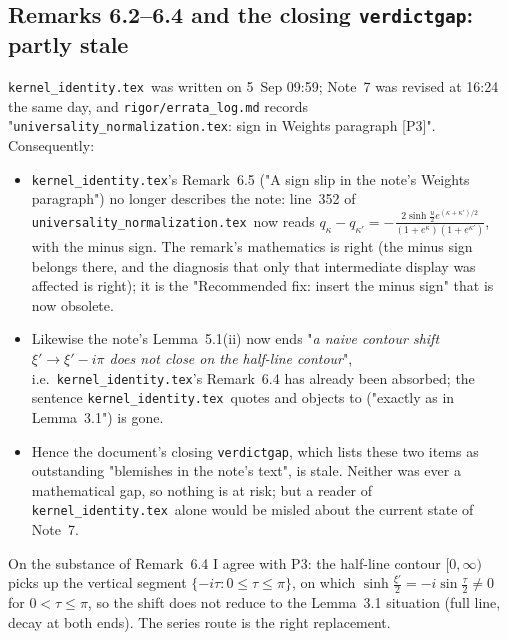 \documentclass[11pt]{article}
\newcommand{\KI}{\texttt{kernel\_identity.tex}}\newcommand{\NOTE}{\texttt{universality\_normalization.tex}}
\begin{document}
\subsection{Remarks 6.2--6.4 and the closing \texttt{verdictgap}: partly stale}
\KI\ was written on 5~Sep 09:59; Note~7 was revised at 16:24 the same day, and
\texttt{rigor/errata\_log.md} records "\NOTE: sign in Weights paragraph [P3]".  Consequently:
\begin{itemize}[leftmargin=1.4em,itemsep=1pt]
\item \KI's Remark~6.5 ("A sign slip in the note's Weights paragraph") no longer describes the
note: line~352 of \NOTE\ now reads \(q_\kappa-q_{\kappa'}=-\frac{2\sinh\frac u2e^{(\kappa+\kappa')/2}}
{(1+e^\kappa)(1+e^{\kappa'})}\), with the minus sign.  The remark's mathematics is right (the minus
sign belongs there, and the diagnosis that only that intermediate display was affected is right);
it is the "Recommended fix: insert the minus sign" that is now obsolete.
\item Likewise the note's Lemma~5.1(ii) now ends "\emph{a naive contour shift \(\xi'\to\xi'-i\pi\)
does not close on the half-line contour}", i.e.\ \KI's Remark~6.4 has already been absorbed; the
sentence \KI\ quotes and objects to ("exactly as in Lemma~3.1") is gone.
\item Hence the document's closing \texttt{verdictgap}, which lists these two items as outstanding
"blemishes in the note's text", is stale.  Neither was ever a mathematical gap, so nothing is at
risk; but a reader of \KI\ alone would be misled about the current state of Note~7.
\end{itemize}
On the substance of Remark~6.4 I agree with P3: the half-line contour \([0,\infty)\) picks up the
vertical segment \(\{-i\tau:0\le\tau\le\pi\}\), on which \(\sinh\frac{\xi'}2=-i\sin\frac\tau2\neq0\)
for \(0<\tau\le\pi\), so the shift does not reduce to the Lemma~3.1 situation (full line, decay at
both ends).  The series route is the right replacement.
\end{document}
